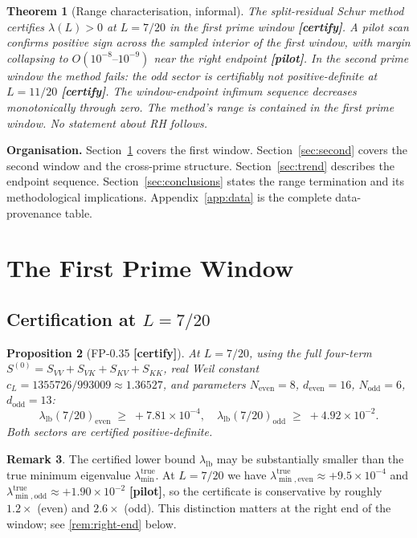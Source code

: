 \documentclass[12pt,a4paper]{amsart}
\theoremstyle{plain}
\newtheorem{theorem}{Theorem}[section]
\newtheorem{proposition}[theorem]{Proposition}
\theoremstyle{definition}
\newtheorem{remark}[theorem]{Remark}
\newcommand{\ltrue}{\lambda_{\min}^{\mathrm{true}}}
\newcommand{\ltrues}[1]{\lambda_{\min,\mathrm{#1}}^{\mathrm{true}}}
\newcommand{\cL}{c_L}
\newcommand{\certify}{\textbf{[certify]}}
\newcommand{\pilot}{\textbf{[pilot]}}
\begin{document}
\begin{theorem}[Range characterisation, informal]
\label{thm:main-informal}
The split-residual Schur method certifies $\lambda(L) > 0$ at $L=7/20$ in
the first prime window \certify.  A pilot scan confirms positive sign across
the sampled interior of the first window, with margin collapsing to
$O(10^{-8}\text{--}10^{-9})$ near the right endpoint \pilot.  In the second
prime window the method fails: the odd sector is certifiably not
positive-definite at $L=11/20$ \certify.  The window-endpoint infimum
sequence decreases monotonically through zero.  The method's range is
contained in the first prime window.  No statement about RH follows.
\end{theorem}

\textbf{Organisation.}  Section~\ref{sec:first} covers the first window.
Section~\ref{sec:second} covers the second window and the cross-prime
structure.  Section~\ref{sec:trend} describes the endpoint sequence.
Section~\ref{sec:conclusions} states the range termination and its
methodological implications.  Appendix~\ref{app:data} is the complete
data-provenance table.

\section{The First Prime Window}
\label{sec:first}

\subsection{Certification at \texorpdfstring{$L=7/20$}{L=7/20}}

\begin{proposition}[FP-0.35 \certify]
\label{prop:fp035}
At $L = 7/20$, using the full four-term $S^{(0)}=S_{VV}+S_{VK}+S_{KV}+S_{KK}$,
real Weil constant $\cL = 1355726/993009 \approx 1.36527$, and parameters
$N_{\mathrm{even}}=8$, $d_{\mathrm{even}}=16$, $N_{\mathrm{odd}}=6$,
$d_{\mathrm{odd}}=13$:
\[
  \lambda_{\mathrm{lb}}(7/20)_{\mathrm{even}} \;\ge\; +7.81\times10^{-4},\quad
  \lambda_{\mathrm{lb}}(7/20)_{\mathrm{odd}}  \;\ge\; +4.92\times10^{-2}.
\]
Both sectors are certified positive-definite.
\end{proposition}

\begin{remark}
The certified lower bound $\lambda_{\mathrm{lb}}$ may be substantially smaller
than the true minimum eigenvalue $\ltrue$.  At $L=7/20$ we have
$\ltrues{even} \approx +9.5\times10^{-4}$ and
$\ltrues{odd} \approx +1.90\times10^{-2}$ \pilot, so the certificate
is conservative by roughly $1.2\times$ (even) and $2.6\times$ (odd).  This
distinction matters at the right end of the window; see
\cref{rem:right-end} below.
\end{remark}
\end{document}
